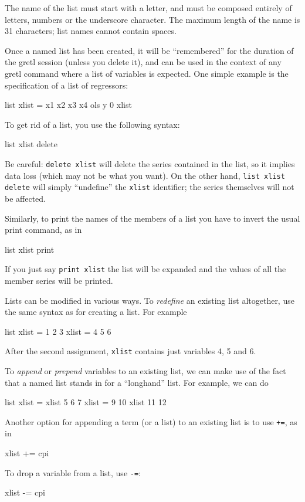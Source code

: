 The name of the list must start with a letter, and must be composed
entirely of letters, numbers or the underscore character.  The maximum
length of the name is 31 characters; list names cannot contain
spaces.  

Once a named list has been created, it will be ``remembered'' for the
duration of the gretl session (unless you delete it), and can be
used in the context of any gretl command where a list of
variables is expected.  One simple example is the specification of a
list of regressors:
%
\begin{code}
list xlist = x1 x2 x3 x4
ols y 0 xlist
\end{code}

To get rid of a list, you use the following syntax:
\begin{code}
  list xlist delete
\end{code}
Be careful: \texttt{delete xlist} will delete the series contained
in the list, so it implies data loss (which may not be what you want).
On the other hand, \texttt{list xlist delete} will simply ``undefine''
the \texttt{xlist} identifier; the series themselves will not be
affected.

Similarly, to print the names of the members of a list you have to
invert the usual print command, as in
\begin{code}
  list xlist print
\end{code}
If you just say \texttt{print xlist} the list will be expanded and
the values of all the member series will be printed.

Lists can be modified in various ways.  To \textit{redefine} an existing
list altogether, use the same syntax as for creating a list.  For
example
%
\begin{code}
list xlist = 1 2 3
xlist = 4 5 6
\end{code}

After the second assignment, \texttt{xlist} contains just variables 4,
5 and 6.

To \textit{append} or \textit{prepend} variables to an existing list,
we can make use of the fact that a named list stands in for a
``longhand'' list.  For example, we can do
%
\begin{code}
list xlist = xlist 5 6 7
xlist = 9 10 xlist 11 12
\end{code}
%
Another option for appending a term (or a list) to an existing list is
to use \texttt{+=}, as in
%
\begin{code}
xlist += cpi
\end{code}
%
To drop a variable from a list, use \texttt{-=}:
%
\begin{code}
xlist -= cpi
\end{code}
%

